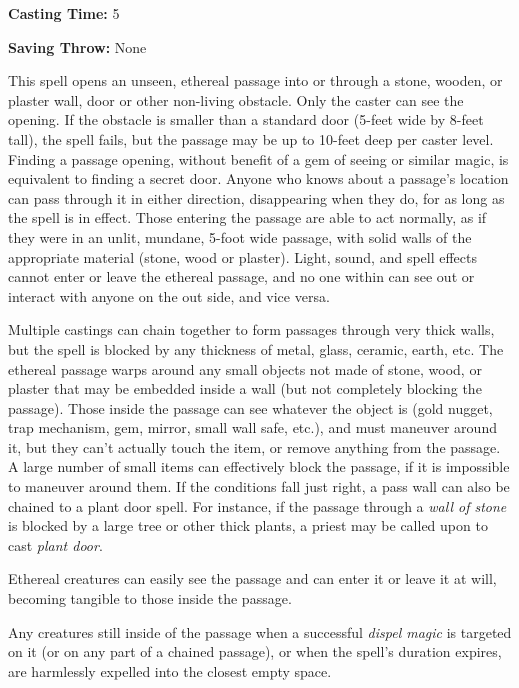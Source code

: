 \begin{multicols}{2}
\begin{minipage}{\columnwidth}
\noindent \textbf{Casting Time:} 5

\noindent \textbf{Saving Throw:} None

\end{minipage}

This spell opens an unseen, ethereal passage into or through a stone, wooden, or plaster wall, door or other non-living obstacle.  Only the caster can see the opening.  If the obstacle is smaller than a standard door (5-feet wide by 8-feet tall), the spell fails, but the passage may be up to 10-feet deep per caster level.  Finding a passage opening, without benefit of a gem of seeing or similar magic, is equivalent to finding a secret door.  Anyone who knows about a passage's location can pass through it in either direction, disappearing when they do, for as long as the spell is in effect.  Those entering the passage are able to act normally, as if they were in an unlit, mundane, 5-foot wide passage, with solid walls of the appropriate material (stone, wood or plaster).  Light, sound, and spell effects cannot enter or leave the ethereal passage, and no one within can see out or interact with anyone on the out side, and vice versa.  

Multiple castings can chain together to form passages through very thick walls, but the spell is blocked by any thickness of metal, glass, ceramic, earth, etc.  The ethereal passage warps around any small objects not made of stone, wood, or plaster that may be embedded inside a wall (but not completely blocking the passage).  Those inside the passage can see whatever the object is (gold nugget, trap mechanism, gem, mirror, small wall safe, etc.), and must maneuver around it, but they can't actually touch the item, or remove anything from the passage.  A large number of small items can effectively block the passage, if it is impossible to maneuver around them.  If the conditions fall just right, a pass wall can also be chained to a plant door spell.  For instance, if the passage through a \textit{wall of stone} is blocked by a large tree or other thick plants, a priest may be called upon to cast \textit{plant door}.

Ethereal creatures can easily see the passage and can enter it or leave it at will, becoming tangible to those inside the passage.

Any creatures still inside of the passage when a successful \textit{dispel magic }is targeted on it (or on any part of a chained passage), or when the spell's duration expires, are harmlessly expelled into the closest empty space.
 

\end{multicols}
